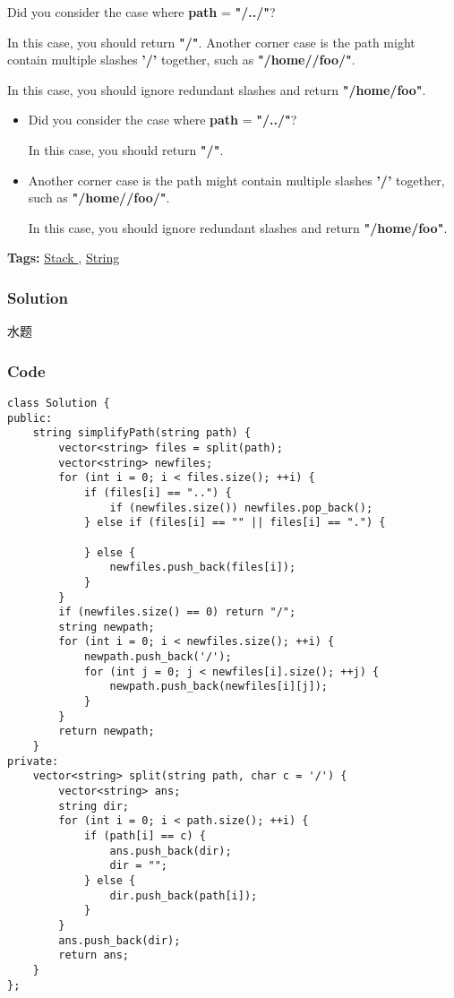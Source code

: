 \documentclass{article}
\begin{document}
\begin{CJK*}{UTF8}{gkai}
Did you consider the case where \textbf{path} = \textbf{"/../"}?


In this case, you should return \textbf{"/"}.
Another corner case is the path might contain multiple slashes \textbf{'/'} together, such as \textbf{"/home//foo/"}.


In this case, you should ignore redundant slashes and return \textbf{"/home/foo"}.
\begin{itemize}
\item Did you consider the case where \textbf{path} = \textbf{"/../"}?


In this case, you should return \textbf{"/"}.
\item Another corner case is the path might contain multiple slashes \textbf{'/'} together, such as \textbf{"/home//foo/"}.


In this case, you should ignore redundant slashes and return \textbf{"/home/foo"}.
\end{itemize}


\textbf{Tags: }
\hyperref[ Stack ]{ Stack },  \hyperref[ String ]{ String }



\subsubsection*{Solution}
水题

\subsubsection*{Code}
\begin{lstlisting}
class Solution {
public:
    string simplifyPath(string path) {
        vector<string> files = split(path);
        vector<string> newfiles;
        for (int i = 0; i < files.size(); ++i) {
            if (files[i] == "..") {
                if (newfiles.size()) newfiles.pop_back();
            } else if (files[i] == "" || files[i] == ".") {
                
            } else {
                newfiles.push_back(files[i]);
            }
        }
        if (newfiles.size() == 0) return "/";
        string newpath;
        for (int i = 0; i < newfiles.size(); ++i) {
            newpath.push_back('/');
            for (int j = 0; j < newfiles[i].size(); ++j) {
                newpath.push_back(newfiles[i][j]);
            }
        }
        return newpath;
    }
private:
    vector<string> split(string path, char c = '/') {
        vector<string> ans;
        string dir;
        for (int i = 0; i < path.size(); ++i) {
            if (path[i] == c) {
                ans.push_back(dir);
                dir = "";
            } else {
                dir.push_back(path[i]);
            }
        }
        ans.push_back(dir);
        return ans;
    }
}; 
\end{lstlisting}



\end{CJK*}
\end{document}
